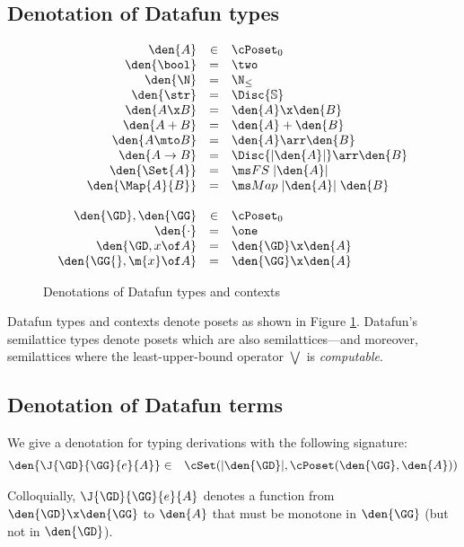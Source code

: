 \subsection{Denotation of Datafun types}
\begin{figure}
  \[\begin{array}{rcl}
  \den{A} &\in& \cPoset_0\\
  \den{\bool} &=& \two\\
  \den{\N} &=& \N_\le\\
  \den{\str} &=& \Disc{\mathbb{S}}\\
  \den{A \x B} &=& \den{A} \x \den{B}\\
  \den{A + B} &=& \den{A} + \den{B}\\
  \den{A \mto B} &=& \den{A} \arr \den{B}\\
  \den{A \uto B} &=& \Disc{\U{\den{A}}} \arr \den{B}\\
  \den{\Set{A}} &=& \FS{\U{\den{A}}}\\
  \den{\Map{A}{B}} &=& \FM{\U{\den{A}}}{\den{B}}
  \\\\
  \den{\GD}, \den{\GG} &\in& \cPoset_0\\
  \den{\cdot} &=& \one\\
  \den{\GD, x\of A} &=& \den{\GD} \x \den{A}\\
  \den{\GG{}, \m{x}\of A} &=& \den{\GG} \x \den{A}
  \end{array}\]
  \caption{Denotations of Datafun types and contexts}
  \label{fig:sem-types}
\end{figure}

Datafun types and contexts denote posets as shown in Figure \ref{fig:sem-types}.
Datafun's semilattice types denote posets which are also semilattices---and
moreover, semilattices where the least-upper-bound operator $\bigvee$ is
\emph{computable}. 

\subsection{Denotation of Datafun terms}

We give a denotation for typing derivations with the following signature:
\begin{eqnarray*}
  \den{\J{\GD}{\GG}{e}{A}} &\in&
  \cSet(\U{\den{\GD}}, \cPoset(\den{\GG}, \den{A}))
\end{eqnarray*}

Colloquially, $\J{\GD}{\GG}{e}{A}$ denotes a function from $\den{\GD} \x
\den{\GG}$ to $\den{A}$ that must be monotone in $\den{\GG}$ (but not in
$\den{\GD}$).
